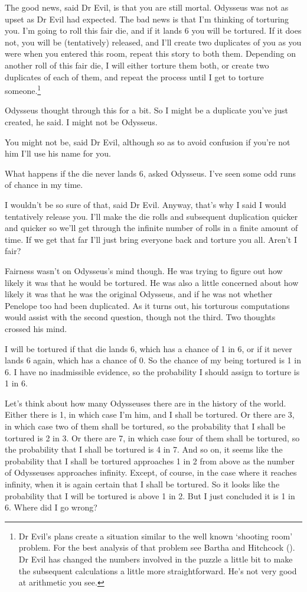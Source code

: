 \documentclass[
  11pt,
  letterpaper,
  DIV=11,
  numbers=noendperiod,
  twoside]{scrartcl}
\begin{document}
The good news, said Dr Evil, is that you are still mortal. Odysseus was
not as upset as Dr Evil had expected. The bad news is that I'm thinking
of torturing you. I'm going to roll this fair die, and if it lands 6 you
will be tortured. If it does not, you will be (tentatively) released,
and I'll create two duplicates of you as you were when you entered this
room, repeat this story to both them. Depending on another roll of this
fair die, I will either torture them both, or create two duplicates of
each of them, and repeat the process until I get to torture
someone.\footnote{Dr Evil's plans create a situation similar to the well
  known `shooting room' problem. For the best analysis of that problem
  see Bartha and Hitchcock (). Dr Evil
  has changed the numbers involved in the puzzle a little bit to make
  the subsequent calculations a little more straightforward. He's not
  very good at arithmetic you see.}

Odysseus thought through this for a bit. So I might be a duplicate
you've just created, he said. I might not be Odysseus.

You might not be, said Dr Evil, although so as to avoid confusion if
you're not him I'll use his name for you.

What happens if the die never lands 6, asked Odysseus. I've seen some
odd runs of chance in my time.

I wouldn't be so sure of that, said Dr Evil. Anyway, that's why I said I
would tentatively release you. I'll make the die rolls and subsequent
duplication quicker and quicker so we'll get through the infinite number
of rolls in a finite amount of time. If we get that far I'll just bring
everyone back and torture you all. Aren't I fair?

Fairness wasn't on Odysseus's mind though. He was trying to figure out
how likely it was that he would be tortured. He was also a little
concerned about how likely it was that he was the original Odysseus, and
if he was not whether Penelope too had been duplicated. As it turns out,
his torturous computations would assist with the second question, though
not the third. Two thoughts crossed his mind.

I will be tortured if that die lands 6, which has a chance of 1 in 6, or
if it never lands 6 again, which has a chance of 0. So the chance of my
being tortured is 1 in 6. I have no inadmissible evidence, so the
probability I should assign to torture is 1 in 6.

Let's think about how many Odysseuses there are in the history of the
world. Either there is 1, in which case I'm him, and I shall be
tortured. Or there are 3, in which case two of them shall be tortured,
so the probability that I shall be tortured is 2 in 3. Or there are 7,
in which case four of them shall be tortured, so the probability that I
shall be tortured is 4 in 7. And so on, it seems like the probability
that I shall be tortured approaches 1 in 2 from above as the number of
Odysseuses approaches infinity. Except, of course, in the case where it
reaches infinity, when it is again certain that I shall be tortured. So
it looks like the probability that I will be tortured is above 1 in 2.
But I just concluded it is 1 in 6. Where did I go wrong?
\end{document}
